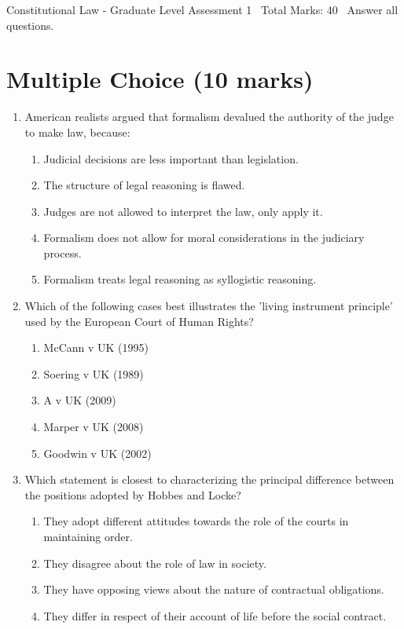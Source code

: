 \documentclass[12pt]{article}
\begin{document}
\begin{center}
Constitutional Law - Graduate Level Assessment 1 \
Total Marks: 40 \
Answer all questions.
\end{center}

\section*{Multiple Choice (10 marks)}
\begin{enumerate}[label=\arabic*.]
\item American realists argued that formalism devalued the authority of the judge to make law, because:
\begin{enumerate}[label=(\alph*)]
    \item Judicial decisions are less important than legislation.
    \item The structure of legal reasoning is flawed.
    \item Judges are not allowed to interpret the law, only apply it.
    \item Formalism does not allow for moral considerations in the judiciary process.
    \item Formalism treats legal reasoning as syllogistic reasoning.
\end{enumerate}
\item Which of the following cases best illustrates the 'living instrument principle' used by the European Court of Human Rights?
\begin{enumerate}[label=(\alph*)]
    \item McCann v UK (1995)
    \item Soering v UK (1989)
    \item A v UK (2009)
    \item Marper v UK (2008)
    \item Goodwin v UK (2002)
\end{enumerate}
\item Which statement is closest to characterizing the principal difference between the positions adopted by Hobbes and Locke?
\begin{enumerate}[label=(\alph*)]
    \item They adopt different attitudes towards the role of the courts in maintaining order.
    \item They disagree about the role of law in society.
    \item They have opposing views about the nature of contractual obligations.
    \item They differ in respect of their account of life before the social contract.

\end{enumerate}
\end{enumerate}
\end{document}
